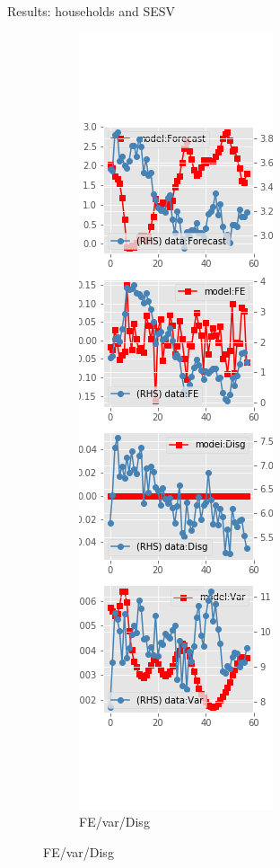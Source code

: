 \documentclass{beamer}
\begin{document}
\begin{frame}{Results: households and SESV}
\begin{figure}[ht]
\begin{subfigure}[b]{0.19\textwidth}
		\end{subfigure}
		\hfill
		\begin{subfigure}[b]{0.19\textwidth}
			\caption{FE/var/Disg}
			\includegraphics[width=\textwidth, height = 0.8\textheight]{figuresDraft/sce_se_est_sv_diag4.png}
		\end{subfigure}
	\end{figure}
\end{frame}
\end{document}

